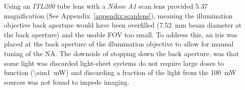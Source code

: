 Using an \emph{ITL200} tube lens with a \emph{Nikon A1} scan lens provided \SI{5.37}{\times} magnification (See Appendix~\ref{appendix:scanlens}), meaning the illumination objective back aperture would have been overfilled (\SI{7.52}{\milli\meter} beam diameter at the back aperture) and the usable \gls{FOV} too small.
To address this, an iris was placed at the back aperture of the illumination objective to allow for manual tuning of the \gls{NA}.
The downside of stopping down the back aperture, was that some light was discarded
\Gls{light-sheet} systems do not require large doses to function (\SI{\sim1}{\milli\watt}) and discarding a fraction of the light from the \SI{100}{\milli\watt} sources was not found to impede imaging.




